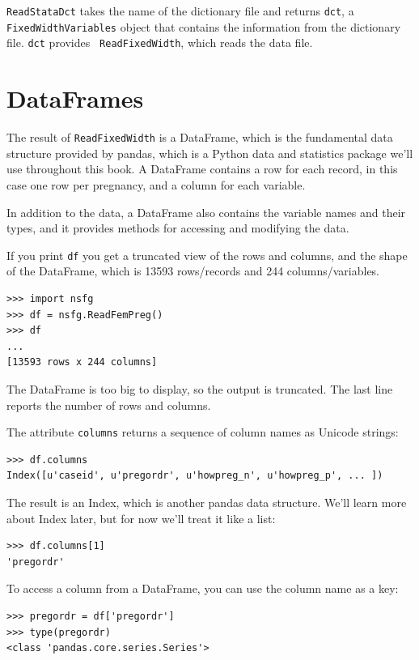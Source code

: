 \documentclass[12pt]{book}
\theoremstyle{exercise}
\begin{document}
{\tt ReadStataDct} takes the name of the dictionary file
and returns {\tt dct}, a {\tt FixedWidthVariables} object that contains the
information from the dictionary file.  {\tt dct} provides {\tt
  ReadFixedWidth}, which reads the data file.


\section{DataFrames}%
\label{dataframe}

The result of {\tt ReadFixedWidth} is a DataFrame, which is the
fundamental data structure provided by pandas, which is a Python
data and statistics package we'll use throughout this book.
A DataFrame contains a
row for each record, in this case one row per pregnancy, and a column
for each variable.%
%

In addition to the data, a DataFrame also contains the variable
names and their types, and it provides methods for accessing and modifying
the data.

If you print {\tt df} you get a truncated view of the rows and
columns, and the shape of the DataFrame, which is 13593
rows/records and 244 columns/variables.

\begin{verbatim}
>>> import nsfg
>>> df = nsfg.ReadFemPreg()
>>> df
...
[13593 rows x 244 columns]
\end{verbatim}

The DataFrame is too big to display, so the output is truncated.  The
last line reports the number of rows and columns.

The attribute {\tt columns} returns a sequence of column
names as Unicode strings:

\begin{verbatim}
>>> df.columns
Index([u'caseid', u'pregordr', u'howpreg_n', u'howpreg_p', ... ])
\end{verbatim}

The result is an Index, which is another pandas data structure.  
We'll learn more about Index later, but for
now we'll treat it like a list:%
%

\begin{verbatim}
>>> df.columns[1]
'pregordr'
\end{verbatim}

To access a column from a DataFrame, you can use the column
name as a key:%

\begin{verbatim}
>>> pregordr = df['pregordr']
>>> type(pregordr)
<class 'pandas.core.series.Series'>
\end{verbatim}
\end{document}
